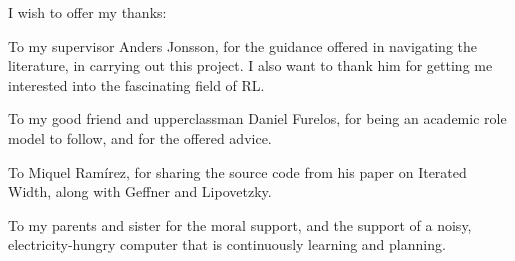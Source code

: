 \newpage
\thispagestyle{empty}
\vfill
{}

I wish to offer my thanks:

To my supervisor Anders Jonsson, for the guidance offered in navigating the
literature, in carrying out this project. I also want to thank him for getting
me interested into the fascinating field of \acs{RL}.

To my good friend and upperclassman Daniel Furelos, for being an academic role
model to follow, and for the offered advice.

To Miquel Ramírez, for sharing the source code from his paper on Iterated Width,
along with Geffner and Lipovetzky.

To my parents and sister for the moral support, and the support of a noisy,
electricity-hungry computer that is continuously learning and planning.

\vfill